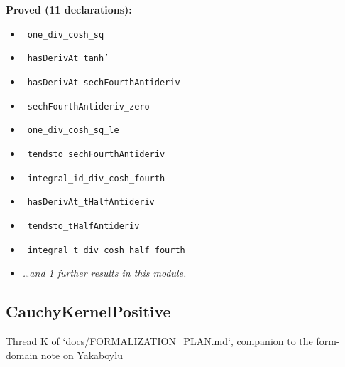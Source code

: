 \documentclass{report}
\theoremstyle{definition}
\begin{document}
\noindent\textbf{Proved (11 declarations):}
\begin{itemize}
  \item {}\leanok\ \texttt{one\_div\_cosh\_sq}
  \item {}\leanok\ \texttt{hasDerivAt\_tanh'}
  \item {}\leanok\ \texttt{hasDerivAt\_sechFourthAntideriv}
  \item {}\leanok\ \texttt{sechFourthAntideriv\_zero}
  \item {}\leanok\ \texttt{one\_div\_cosh\_sq\_le}
  \item {}\leanok\ \texttt{tendsto\_sechFourthAntideriv}
  \item {}\leanok\ \texttt{integral\_id\_div\_cosh\_fourth}
  \item {}\leanok\ \texttt{hasDerivAt\_tHalfAntideriv}
  \item {}\leanok\ \texttt{tendsto\_tHalfAntideriv}
  \item {}\leanok\ \texttt{integral\_t\_div\_cosh\_half\_fourth}
  \item \emph{\ldots and 1 further results in this module.}
\end{itemize}

\subsection{CauchyKernelPositive}
Thread K of `docs/FORMALIZATION\_PLAN.md`, companion to the form-domain note on Yakaboylu
\end{document}
